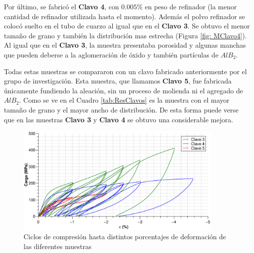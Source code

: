 \documentclass[a4paper,12pt,fleqn,twoside,openany]{book}
\begin{document}
Por último, se fabricó el  \textbf{Clavo 4}, con $0.005 \%$ en peso de refinador (la menor cantidad de refinador utilizada hasta el momento). Además el polvo refinador se colocó suelto en el tubo de cuarzo al igual que en el \textbf{Clavo 3}. Se obtuvo el menor tamaño de grano y también la distribución mas estrecha (Figura \ref{fig: MClavo4}). Al igual que en el \textbf{Clavo 3}, la muestra presentaba porosidad y algunas manchas que pueden deberse a la aglomeración de óxido y también partículas de $AlB_2$.
 


Todas estas muestras se compararon con un clavo fabricado anteriormente por el grupo de investigación. Esta muestra, que llamamos \textbf{Clavo 5}, fue fabricada únicamente fundiendo la aleación, sin un proceso de molienda ni el agregado de $AlB_2$. Como se ve en el Cuadro \ref{tab:ResClavos} es la muestra con el mayor tamaño de grano y el mayor ancho de distribución. De esta forma puede verse que en las muestras \textbf{Clavo 3} y \textbf{Clavo 4} se obtuvo una considerable mejora.   
 \begin{figure}[h]
 \centering
 \includegraphics[width=0.9\textwidth]{Img/Resultados/clavos/Clavos_3_4_5.eps}
 \caption{Ciclos de compresión hasta distintos porcentajes de deformación de las diferentes muestras  } 
 \label{fig: Clavos3y4}
 \end{figure}
\end{document}
